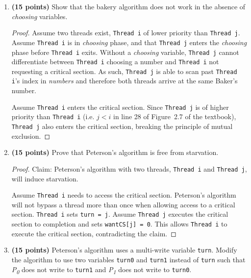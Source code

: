 \documentclass[11pt]{article}
\begin{document}
\begin{enumerate}
\item \textbf{(15 points)} Show that the bakery algorithm does not work in the
  absence of \emph{choosing} variables.
  	\begin{proof}
		Assume two threads exist, \texttt{Thread i} of lower priority than \texttt{Thread j}. Assume \texttt{Thread i} is in \emph{choosing} phase, and that \texttt{Thread j} enters the \emph{choosing} phase before \texttt{Thread i} exits. Without a \emph{choosing} variable, \texttt{Thread j} cannot differentiate between \texttt{Thread i} choosing a number and \texttt{Thread i} not requesting a critical section. As such, \texttt{Thread j} is able to scan past \texttt{Thread i}'s index in \emph{numbers} and therefore both threads arrive at the same Baker's number.
		
		Assume \texttt{Thread i} enters the critical section. Since \texttt{Thread j} is of higher priority than \texttt{Thread i} (i.e. $j < i$ in line 28 of Figure~2.7 of the textbook), \texttt{Thread j} also enters the critical section, breaking the principle of mutual exclusion.
	\end{proof}
\item \textbf{(15 points)} Prove that Peterson's algorithm is free from starvation.
\begin{proof}
	Claim: Peterson's algorithm with two threads, \texttt{Thread i} and \texttt{Thread j}, will induce starvation. 
	
	Assume \texttt{Thread i} needs to access the critical section. Peterson's algorithm will not bypass a thread more than once when allowing access to a critical section. \texttt{Thread i} sets \texttt{turn = j}. Assume \texttt{Thread j} executes the critical section to completion and sets \texttt{wantCS[j] = 0}. This allows \texttt{Thread i} to execute the critical section, contradicting the claim.
\end{proof}

\item \textbf{(15 points)} Peterson's algorithm uses a multi-write variable
  \texttt{turn}. Modify the algorithm to use two variables \texttt{turn0} and
  \texttt{turn1} instead of \texttt{turn} such that \emph{P\textsubscript{0}}
  does not write to \texttt{turn1} and \emph{P\textsubscript{1}} does not write
  to \texttt{turn0}.
  



\end{enumerate}
\end{document}
